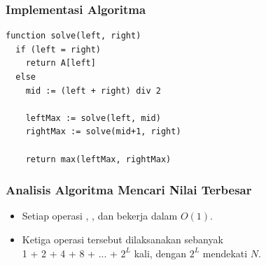 \begin{frame}[fragile]
\frametitle{Implementasi Algoritma}
\begin{lstlisting}
function solve(left, right)
  if (left = right)
    return A[left]
  else
    mid := (left + right) div 2

    leftMax := solve(left, mid)
    rightMax := solve(mid+1, right)

    return max(leftMax, rightMax)
\end{lstlisting}
\end{frame}

\begin{frame}
\frametitle{Analisis Algoritma Mencari Nilai Terbesar}
\begin{itemize}
  \item Setiap operasi , , dan  bekerja dalam $O(1)$.
  \item Ketiga operasi tersebut dilaksanakan sebanyak\\1 + 2 + 4 + 8 + ... + $2^L$ kali, dengan $2^L$ mendekati $N$.
\end{itemize}
\end{frame}


